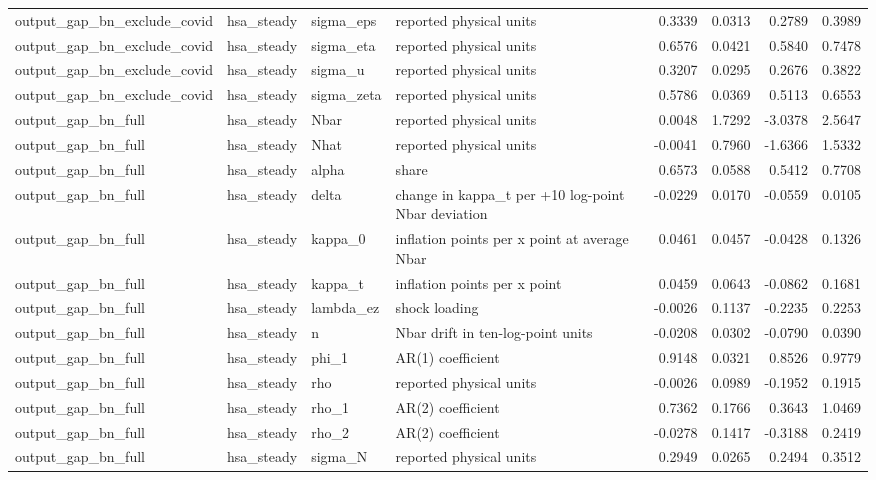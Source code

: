 \begin{tabular}{llllrrrr}
output\_gap\_bn\_exclude\_covid & hsa\_steady & sigma\_eps & reported physical units & 0.3339 & 0.0313 & 0.2789 & 0.3989 \\
output\_gap\_bn\_exclude\_covid & hsa\_steady & sigma\_eta & reported physical units & 0.6576 & 0.0421 & 0.5840 & 0.7478 \\
output\_gap\_bn\_exclude\_covid & hsa\_steady & sigma\_u & reported physical units & 0.3207 & 0.0295 & 0.2676 & 0.3822 \\
output\_gap\_bn\_exclude\_covid & hsa\_steady & sigma\_zeta & reported physical units & 0.5786 & 0.0369 & 0.5113 & 0.6553 \\
output\_gap\_bn\_full & hsa\_steady & Nbar & reported physical units & 0.0048 & 1.7292 & -3.0378 & 2.5647 \\
output\_gap\_bn\_full & hsa\_steady & Nhat & reported physical units & -0.0041 & 0.7960 & -1.6366 & 1.5332 \\
output\_gap\_bn\_full & hsa\_steady & alpha & share & 0.6573 & 0.0588 & 0.5412 & 0.7708 \\
output\_gap\_bn\_full & hsa\_steady & delta & change in kappa\_t per +10 log-point Nbar deviation & -0.0229 & 0.0170 & -0.0559 & 0.0105 \\
output\_gap\_bn\_full & hsa\_steady & kappa\_0 & inflation points per x point at average Nbar & 0.0461 & 0.0457 & -0.0428 & 0.1326 \\
output\_gap\_bn\_full & hsa\_steady & kappa\_t & inflation points per x point & 0.0459 & 0.0643 & -0.0862 & 0.1681 \\
output\_gap\_bn\_full & hsa\_steady & lambda\_ez & shock loading & -0.0026 & 0.1137 & -0.2235 & 0.2253 \\
output\_gap\_bn\_full & hsa\_steady & n & Nbar drift in ten-log-point units & -0.0208 & 0.0302 & -0.0790 & 0.0390 \\
output\_gap\_bn\_full & hsa\_steady & phi\_1 & AR(1) coefficient & 0.9148 & 0.0321 & 0.8526 & 0.9779 \\
output\_gap\_bn\_full & hsa\_steady & rho & reported physical units & -0.0026 & 0.0989 & -0.1952 & 0.1915 \\
output\_gap\_bn\_full & hsa\_steady & rho\_1 & AR(2) coefficient & 0.7362 & 0.1766 & 0.3643 & 1.0469 \\
output\_gap\_bn\_full & hsa\_steady & rho\_2 & AR(2) coefficient & -0.0278 & 0.1417 & -0.3188 & 0.2419 \\
output\_gap\_bn\_full & hsa\_steady & sigma\_N & reported physical units & 0.2949 & 0.0265 & 0.2494 & 0.3512 \\

\end{tabular}
